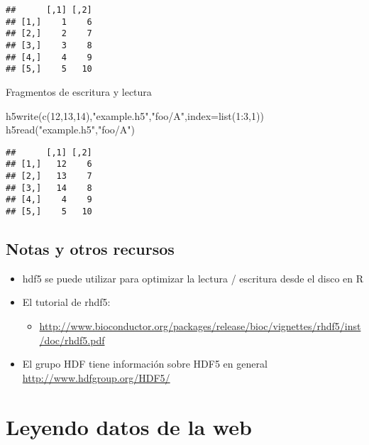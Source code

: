 \documentclass[
]{article}
\newenvironment{Shaded}{\begin{snugshade}}{\end{snugshade}}
\newcommand{\AttributeTok}[1]{\textcolor[rgb]{0.77,0.63,0.00}{#1}}
\newcommand{\DecValTok}[1]{\textcolor[rgb]{0.00,0.00,0.81}{#1}}
\newcommand{\FunctionTok}[1]{\textcolor[rgb]{0.00,0.00,0.00}{#1}}
\newcommand{\NormalTok}[1]{#1}
\newcommand{\SpecialCharTok}[1]{\textcolor[rgb]{0.00,0.00,0.00}{#1}}
\newcommand{\StringTok}[1]{\textcolor[rgb]{0.31,0.60,0.02}{#1}}
\providecommand{\tightlist}{%
  \setlength{\itemsep}{0pt}\setlength{\parskip}{0pt}}
\begin{document}
\begin{verbatim}
##      [,1] [,2]
## [1,]    1    6
## [2,]    2    7
## [3,]    3    8
## [4,]    4    9
## [5,]    5   10
\end{verbatim}

Fragmentos de escritura y lectura

\begin{Shaded}
\begin{Highlighting}[]
\FunctionTok{h5write}\NormalTok{(}\FunctionTok{c}\NormalTok{(}\DecValTok{12}\NormalTok{,}\DecValTok{13}\NormalTok{,}\DecValTok{14}\NormalTok{),}\StringTok{"example.h5"}\NormalTok{,}\StringTok{"foo/A"}\NormalTok{,}\AttributeTok{index=}\FunctionTok{list}\NormalTok{(}\DecValTok{1}\SpecialCharTok{:}\DecValTok{3}\NormalTok{,}\DecValTok{1}\NormalTok{))}
\FunctionTok{h5read}\NormalTok{(}\StringTok{"example.h5"}\NormalTok{,}\StringTok{"foo/A"}\NormalTok{)}
\end{Highlighting}
\end{Shaded}

\begin{verbatim}
##      [,1] [,2]
## [1,]   12    6
## [2,]   13    7
## [3,]   14    8
## [4,]    4    9
## [5,]    5   10
\end{verbatim}

\hypertarget{notas-y-otros-recursos}{%
\subsection{Notas y otros recursos}\label{notas-y-otros-recursos}}

\begin{itemize}
\tightlist
\item
  hdf5 se puede utilizar para optimizar la lectura / escritura desde el
  disco en R
\item
  El tutorial de rhdf5:

  \begin{itemize}
  \tightlist
  \item
    \href{http://www.bioconductor.org/packages/release/bioc/vignettes/rhdf5\%20/inst/doc/rhdf5.pdf}{http://www.bioconductor.org/packages/release/bioc/vignettes/rhdf5/inst/doc/rhdf5.pdf}
  \end{itemize}
\item
  El grupo HDF tiene información sobre HDF5 en general
  \url{http://www.hdfgroup.org/HDF5/}
\end{itemize}

\hypertarget{leyendo-datos-de-la-web}{%
\section{Leyendo datos de la web}\label{leyendo-datos-de-la-web}}
\end{document}
